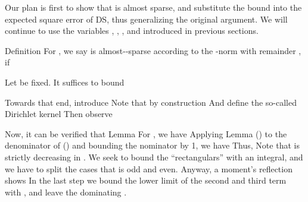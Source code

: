 \startchapter [title={Theorems and Proofs}]

Our plan is first to show that  is almost sparse, and substitute the bound into the expected square error of DS, thus generalizing the original argument.
We will continue to use the variables , , , and  introduced in previous sections.

\startsection [title={Almost-Sparsity of Array Response \m {\V{a}}}]

\Result
{Definition}
{
For , we say  is almost--sparse according to the -norm with remainder , if
}

Let \m {\f} be fixed.
It suffices to bound

Towards that end, introduce
Note that by construction
And define the so-called Dirichlet kernel
Then observe

Now, it can be verified that
\Result
{Lemma}
{
For , we have
}
Applying Lemma () to the denominator of () and bounding the nominator by 1, we have
Thus,
Note that  is strictly decreasing in .
We seek to bound the ``rectangulars'' with an integral, and we have to split the cases that  is odd and even.
Anyway, a moment's reflection shows
In the last step we bound the lower limit of the second and third term with , and leave the dominating .

